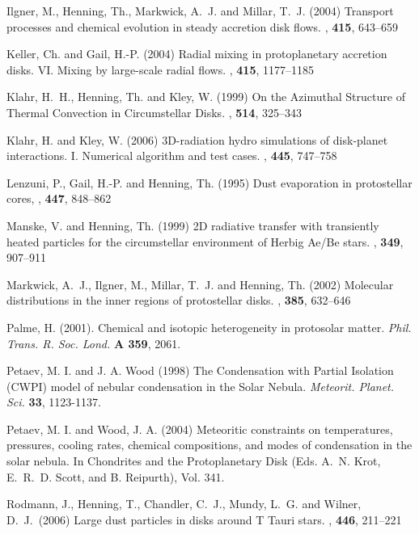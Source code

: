 \begin{ownpubl}
\item
Ilgner, M., Henning, Th., Markwick, A.~J. and Millar, T.~J. (2004) Transport
processes and chemical evolution in steady accretion disk flows. \aap,
\textbf{415}, 643--659

\item
Keller, Ch. and Gail, H.-P. (2004) Radial mixing in protoplanetary accretion
disks. VI. Mixing by large-scale radial flows. \aap, \textbf{415}, 1177--1185

\item
Klahr, H.~H., Henning, Th. and Kley, W. (1999) On the Azimuthal Structure of
Thermal Convection in Circumstellar Disks. \apj, \textbf{514}, 325--343

\item
Klahr, H. and Kley, W. (2006) 3D-radiation hydro simulations of disk-planet
interactions. I. Numerical algorithm and test cases. \aap, \textbf{445},
747--758

\item
Lenzuni, P., Gail, H.-P. and Henning, Th. (1995) Dust evaporation in
protostellar cores, \apj, \textbf{447}, 848--862

\item
Manske, V. and Henning, Th. (1999) 2D radiative transfer with transiently heated
particles for the circumstellar environment of Herbig Ae/Be stars. \aap,
\textbf{349}, 907--911

\item
Markwick, A.~J., Ilgner, M., Millar, T.~J. and Henning, Th. (2002) Molecular
distributions in the inner regions of protostellar disks. \aap, \textbf{385},
632--646

\item Palme, H. (2001).  Chemical and isotopic heterogeneity in protosolar matter.  \textit{Phil. Trans. R. Soc. Lond.} \textbf{A 359}, 2061.   

\item Petaev, M. I. and J. A. Wood (1998) The Condensation with Partial
Isolation (CWPI) model of nebular condensation in the Solar Nebula.
\textit{Meteorit. Planet. Sci.}
\textbf{33}, 1123-1137.

\item Petaev, M. I. and  Wood, J. A. (2004) Meteoritic constraints on
temperatures, pressures, cooling rates, chemical compositions, and modes of
condensation in the solar nebula. In Chondrites and the Protoplanetary Disk
(Eds. A.~N.  Krot, E.~R.~D. Scott, and B. Reipurth), Vol. 341.


\item
Rodmann, J., Henning, T., Chandler, C.~J., Mundy, L.~G.
and Wilner, D.~J.\ (2006) Large dust particles in disks around T Tauri stars.
\aap, \textbf{446}, 211--221


\end{ownpubl}
